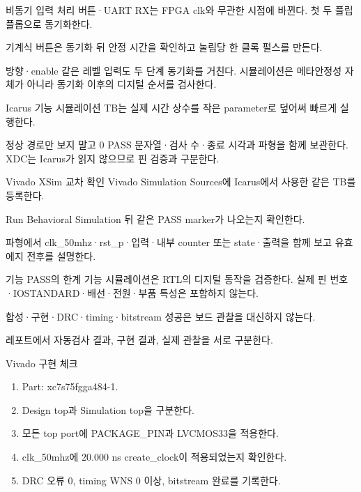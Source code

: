 \begin{frame}{비동기 입력 처리}
\small
버튼·UART RX는 FPGA clk와 무관한 시점에 바뀐다. 첫 두 플립플롭으로 동기화한다.\par\vspace{0.28cm}
기계식 버튼은 동기화 뒤 안정 시간을 확인하고 눌림당 한 클록 펄스를 만든다.\par\vspace{0.28cm}
방향·enable 같은 레벨 입력도 두 단계 동기화를 거친다. 시뮬레이션은 메타안정성 자체가 아니라 동기화 이후의 디지털 순서를 검사한다.
\end{frame}
\begin{frame}[label=verification]{Icarus 기능 시뮬레이션}
\small
TB는 실제 시간 상수를 작은 parameter로 덮어써 빠르게 실행한다.\par\vspace{0.25cm}
정상 경로만 보지 말고 0%
PASS 문자열·검사 수·종료 시각과 파형을 함께 보관한다. XDC는 Icarus가 읽지 않으므로 핀 검증과 구분한다.
\end{frame}
\begin{frame}{Vivado XSim 교차 확인}
\small
Vivado Simulation Sources에 Icarus에서 사용한 같은 TB를 등록한다.\par\vspace{0.25cm}
Run Behavioral Simulation 뒤 같은 PASS marker가 나오는지 확인한다.\par\vspace{0.25cm}
파형에서 clk\_50mhz·rst\_p·입력·내부 counter 또는 state·출력을 함께 보고 유효 에지 전후를 설명한다.
\end{frame}
\begin{frame}{기능 PASS의 한계}
\small
기능 시뮬레이션은 RTL의 디지털 동작을 검증한다. 실제 핀 번호·IOSTANDARD·배선·전원·부품 특성은 포함하지 않는다.\par\vspace{0.28cm}
합성·구현·DRC·timing·bitstream 성공은 보드 관찰을 대신하지 않는다.\par\vspace{0.28cm}
레포트에서 자동검사 결과, 구현 결과, 실제 관찰을 서로 구분한다.
\end{frame}
\begin{frame}[label=hardware]{Vivado 구현 체크}
\small
\begin{enumerate}
\item Part: xc7s75fgga484-1.
\item Design top과 Simulation top을 구분한다.
\item 모든 top port에 PACKAGE\_PIN과 LVCMOS33을 적용한다.
\item clk\_50mhz에 20.000 ns create\_clock이 적용되었는지 확인한다.
\item DRC 오류 0, timing WNS 0 이상, bitstream 완료를 기록한다.
\end{enumerate}
\end{frame}
